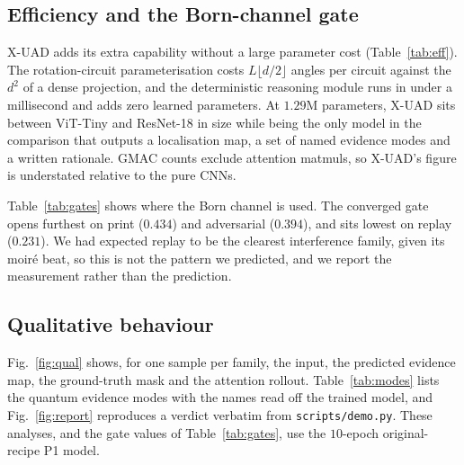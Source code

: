 \documentclass[conference]{IEEEtran}
\begin{document}
\begin{table}[t]
\centering
\caption{Open-set ablation on the face-swap leave-one-attack-out fold, where the
uncertainty channel is exercised.}
\label{tab:oablate}
\small
\resizebox{\linewidth}{!}{}
\end{table}

\subsection{Efficiency and the Born-channel gate}
X-UAD adds its extra capability without a large parameter cost
(Table~\ref{tab:eff}). The rotation-circuit parameterisation costs
$L\lfloor d/2\rfloor$ angles per circuit against the $d^{2}$ of a dense projection,
and the deterministic reasoning module runs in under a millisecond and adds zero
learned parameters. At $1.29$M parameters, X-UAD sits between ViT-Tiny and
ResNet-18 in size while being the only model in the comparison that outputs a
localisation map, a set of named evidence modes and a written rationale. GMAC counts
exclude attention matmuls, so X-UAD's figure is understated relative to the pure
CNNs.

\begin{table}[t]
\centering
\caption{Inference cost, CPU, single $112\times112$ crop.}
\label{tab:eff}
\small
\resizebox{\linewidth}{!}{}
\end{table}

Table~\ref{tab:gates} shows where the Born channel is used. The converged
gate opens furthest on print ($0.434$) and adversarial ($0.394$), and sits lowest on
replay ($0.231$). We had expected replay to be the clearest interference family,
given its moir\'e beat, so this is not the pattern we predicted, and we report the
measurement rather than the prediction.

\begin{table}[t]
\centering
\caption{Converged adaptive gate $g$, the fraction of the attention score taken from
the Born channel, averaged over heads, layers, and test samples of each family.}
\label{tab:gates}
\small

\end{table}

\subsection{Qualitative behaviour}\label{sec:qual}
Fig.~\ref{fig:qual} shows, for one sample per family, the input, the predicted
evidence map, the ground-truth mask and the attention rollout. Table~\ref{tab:modes}
lists the quantum evidence modes with the names read off the trained model, and
Fig.~\ref{fig:report} reproduces a verdict verbatim from \texttt{scripts/demo.py}.
These analyses, and the gate values of Table~\ref{tab:gates}, use the $10$-epoch
original-recipe P1 model.
\end{document}
